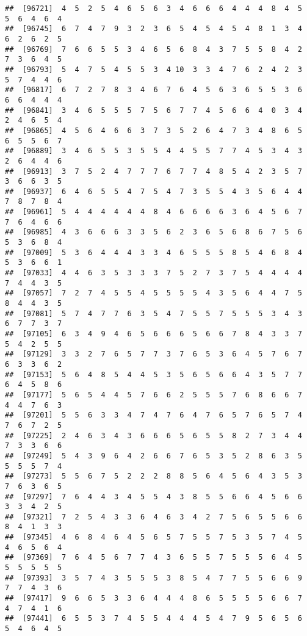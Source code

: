 \documentclass[
]{book}
\begin{document}
\begin{verbatim}
##  [96721]  4  5  2  5  4  6  5  6  3  4  6  6  6  4  4  4  8  4  5  5  6  4  6  4
##  [96745]  6  7  4  7  9  3  2  3  6  5  4  5  4  5  4  8  1  3  4  6  2  6  2  5
##  [96769]  7  6  6  5  5  3  4  6  5  6  8  4  3  7  5  5  8  4  2  7  3  6  4  5
##  [96793]  5  4  7  5  4  5  5  3  4 10  3  3  4  7  6  2  4  2  3  5  7  4  4  6
##  [96817]  6  7  2  7  8  3  4  6  7  6  4  5  6  3  6  5  5  3  6  6  6  4  4  4
##  [96841]  3  4  6  5  5  5  7  5  6  7  7  4  5  6  6  4  0  3  4  2  4  6  5  4
##  [96865]  4  5  6  4  6  6  3  7  3  5  2  6  4  7  3  4  8  6  5  6  5  5  6  7
##  [96889]  3  4  6  5  5  3  5  5  4  4  5  5  7  7  4  5  3  4  3  2  6  4  4  6
##  [96913]  3  7  5  2  4  7  7  7  6  7  7  4  8  5  4  2  3  5  7  3  6  6  3  5
##  [96937]  6  4  6  5  5  4  7  5  4  7  3  5  5  4  3  5  6  4  4  7  8  7  8  4
##  [96961]  5  4  4  4  4  4  4  8  4  6  6  6  6  3  6  4  5  6  7  7  6  4  6  6
##  [96985]  4  3  6  6  6  3  3  5  6  2  3  6  5  6  8  6  7  5  6  5  3  6  8  4
##  [97009]  5  3  6  4  4  4  3  3  4  6  5  5  5  8  5  4  6  8  4  5  3  6  6  1
##  [97033]  4  4  6  3  5  3  3  3  7  5  2  7  3  7  5  4  4  4  4  7  4  4  3  5
##  [97057]  7  2  7  4  5  5  4  5  5  5  5  4  3  5  6  4  4  7  5  8  4  4  3  5
##  [97081]  5  7  4  7  7  6  3  5  4  7  5  5  7  5  5  5  3  4  3  6  7  7  3  7
##  [97105]  6  3  4  9  4  6  5  6  6  6  5  6  6  7  8  4  3  3  7  5  4  2  5  5
##  [97129]  3  3  2  7  6  5  7  7  3  7  6  5  3  6  4  5  7  6  7  6  3  3  6  2
##  [97153]  5  6  4  8  5  4  4  5  3  5  6  5  6  6  4  3  5  7  7  6  4  5  8  6
##  [97177]  5  6  5  4  4  5  7  6  6  2  5  5  5  7  6  8  6  6  7  4  4  7  6  3
##  [97201]  5  5  6  3  3  4  7  4  7  6  4  7  6  5  7  6  5  7  4  7  6  7  2  5
##  [97225]  2  4  6  3  4  3  6  6  6  5  6  5  5  8  2  7  3  4  4  7  3  3  6  6
##  [97249]  5  4  3  9  6  4  2  6  6  7  6  5  3  5  2  8  6  3  5  5  5  5  7  4
##  [97273]  5  5  6  7  5  2  2  2  8  8  5  6  4  5  6  4  3  5  3  7  6  3  6  5
##  [97297]  7  6  4  4  3  4  5  5  4  3  8  5  5  6  6  4  5  6  6  3  3  4  2  5
##  [97321]  7  2  5  4  3  3  6  4  6  3  4  2  7  5  6  5  5  6  6  8  4  1  3  3
##  [97345]  4  6  8  4  6  4  5  6  5  7  5  5  7  5  3  5  7  4  5  4  6  5  6  4
##  [97369]  7  6  4  5  6  7  7  4  3  6  5  5  7  5  5  5  6  4  5  5  5  5  5  5
##  [97393]  3  5  7  4  3  5  5  5  3  8  5  4  7  7  5  5  6  6  9  7  7  4  3  6
##  [97417]  9  6  6  5  3  3  6  4  4  4  8  6  5  5  5  5  6  6  7  4  7  4  1  6
##  [97441]  6  5  5  3  7  4  5  5  4  4  4  5  4  7  9  5  6  5  6  5  4  6  4  5

\end{verbatim}
\end{document}
